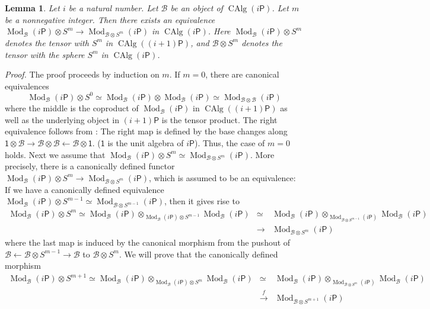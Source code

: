 \documentclass[leqno,12pt]{amsart}
\theoremstyle{plain}
\newtheorem{Lemma}[Theorem]{Lemma}
\theoremstyle{definition}
\newcommand{\BBB}{\mathcal{B}}
\newcommand{\Mod}{\operatorname{Mod}}
\newcommand{\CAlg}{\operatorname{CAlg}}
\newcommand{\Proof}{{\sl Proof.}\quad}
\begin{document}
\begin{Lemma}
\label{algebramonoidal}
Let $i$ be a natural number.
Let $\BBB$ be an object of $\CAlg(i\mathsf{P})$.
Let $m$ be a nonnegative integer.
Then there exists an equivalence
$\Mod_{\BBB}(i\mathsf{P})\otimes S^m\to\Mod_{\BBB\otimes S^m}(i\mathsf{P})$ in $\CAlg(i\mathsf{P})$. 
Here $\Mod_{\BBB}(i\mathsf{P})\otimes S^m$ denotes the tensor with $S^m$ in $\CAlg((i+1)\mathsf{P})$,
and $\BBB\otimes S^m$ denotes the tensor with the sphere $S^m$ in $\CAlg(i\mathsf{P})$.
\end{Lemma}



\Proof
The proof proceeds by induction on $m$.
If $m=0$, there are canonical equivalences
\[
\Mod_{\BBB}(i\mathsf{P})\otimes S^0\simeq \Mod_{\BBB}(i\mathsf{P})\otimes\Mod_{\BBB}(i\mathsf{P})\simeq \Mod_{\BBB\otimes \BBB}(i\mathsf{P})
\]
where the middle is the coproduct of $\Mod_{\BBB}(i\mathsf{P})$ in $\CAlg((i+1)\mathsf{P})$ as well as the underlying object in $(i+1)\mathsf{P}$ is the tensor product.
The right equivalence follows from \cite[4.8.5.16]{HA}: The right map is defined by the base changes along  $\mathsf{1}\otimes \BBB\to \BBB\otimes \BBB\leftarrow \BBB\otimes\mathsf{1}$.
($\mathsf{1}$ is the unit algebra of $i\mathsf{P}$).  Thus, the case of $m=0$ holds.
Next we assume that $\Mod_{\BBB}(i\mathsf{P})\otimes S^m\simeq \Mod_{\BBB\otimes S^m}(i\mathsf{P})$.
More precisely, there is a canonically defined functor $\Mod_{\BBB}(i\mathsf{P})\otimes S^m\to \Mod_{\BBB\otimes S^m}(i\mathsf{P})$, which is assumed to be an equivalence: If we have a canonically defined equivalence
$\Mod_{\BBB}(i\mathsf{P})\otimes S^{m-1}\simeq \Mod_{\BBB\otimes S^{m-1}}(i\mathsf{P})$, then it gives rise to  
\begin{eqnarray*}
\Mod_{\BBB}(i\mathsf{P})\otimes S^m\simeq \Mod_{\BBB}(i\mathsf{P})\otimes_{\Mod_{\BBB}(i\mathsf{P})\otimes S^{m-1}}\Mod_{\BBB}(i\mathsf{P}) &\simeq& \Mod_{\BBB}(i\mathsf{P})\otimes_{\Mod_{\BBB\otimes S^{m-1}}(i\mathsf{P})}\Mod_{\BBB}(i\mathsf{P})   \\
&\to& \Mod_{\BBB\otimes S^m}(i\mathsf{P})
\end{eqnarray*}
where the last map is induced by the canonical morphism from
the pushout of $\BBB\leftarrow \BBB\otimes S^{m-1}\to \BBB$ to $\BBB\otimes S^m$.
We will prove that the canonically defined morphism 
\begin{eqnarray*}
\Mod_{\BBB}(i\mathsf{P})\otimes S^{m+1}\simeq \Mod_{\BBB}(i\mathsf{P})\otimes_{\Mod_{\BBB}(i\mathsf{P})\otimes S^{m}}\Mod_{\BBB}(i\mathsf{P}) &\simeq& \Mod_{\BBB}(i\mathsf{P})\otimes_{\Mod_{\BBB\otimes S^{m}}(i\mathsf{P})}\Mod_{\BBB}(i\mathsf{P})  \\ &\stackrel{f}{\to}& \Mod_{\BBB\otimes S^{m+1}}(i\mathsf{P})
\end{eqnarray*}
\end{document}
